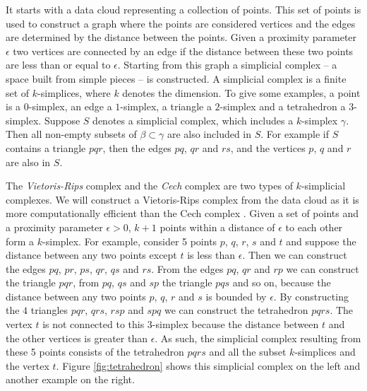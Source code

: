 \documentclass[11pt,a4paper,]{article}
\theoremstyle{definition}
\theoremstyle{definition}
\theoremstyle{definition}
\theoremstyle{remark}
\begin{document}
It starts with a data cloud representing a collection of points. This set of points is used to construct a graph where the points are considered vertices and the edges are determined by the distance between the points. Given a proximity parameter \(\epsilon\) two vertices are connected by an edge if the distance between these two points are less than or equal to \(\epsilon\). Starting from this graph a simplicial complex -- a space built from simple pieces -- is constructed. A simplicial complex is a finite set of \(k\)-simplices, where \(k\) denotes the dimension. To give some examples, a point is a \(0\)-simplex, an edge a \(1\)-simplex, a triangle a \(2\)-simplex and a tetrahedron a \(3\)-simplex. Suppose \(S\) denotes a simplicial complex, which includes a \(k\)-simplex \(\gamma\). Then all non-empty subsets of \(\beta \subset \gamma\) are also included in \(S\). For example if \(S\) contains a triangle \(pqr\), then the edges \(pq\), \(qr\) and \(rs\), and the vertices \(p\), \(q\) and \(r\) are also in \(S\).

The \emph{Vietoris-Rips} complex and the \emph{Cech} complex are two types of \(k\)-simplicial complexes. We will construct a Vietoris-Rips complex from the data cloud as it is more computationally efficient than the Cech complex \autocite{ghrist2008barcodes}. Given a set of points and a proximity parameter \(\epsilon > 0\), \(k+1\) points within a distance of \(\epsilon\) to each other form a \(k\)-simplex. For example, consider 5 points \(p\), \(q\), \(r\), \(s\) and \(t\) and suppose the distance between any two points except \(t\) is less than \(\epsilon\). Then we can construct the edges \(pq\), \(pr\), \(ps\), \(qr\), \(qs\) and \(rs\). From the edges \(pq\), \(qr\) and \(rp\) we can construct the triangle \(pqr\), from \(pq\), \(qs\) and \(sp\) the triangle \(pqs\) and so on, because the distance between any two points \(p\), \(q\), \(r\) and \(s\) is bounded by \(\epsilon\). By constructing the \(4\) triangles \(pqr\), \(qrs\), \(rsp\) and \(spq\) we can construct the tetrahedron \(pqrs\). The vertex \(t\) is not connected to this \(3\)-simplex because the distance between \(t\) and the other vertices is greater than \(\epsilon\). As such, the simplicial complex resulting from these 5 points consists of the tetrahedron \(pqrs\) and all the subset \(k\)-simplices and the vertex \(t\). Figure \ref{fig:tetrahedron} shows this simplicial complex on the left and another example on the right.
\end{document}
